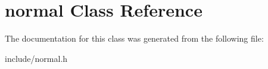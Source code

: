 \hypertarget{classnormal}{}\section{normal Class Reference}
\label{classnormal}


The documentation for this class was generated from the following file\+:\begin{DoxyCompactItemize}
\item 
include/normal.\+h\end{DoxyCompactItemize}
